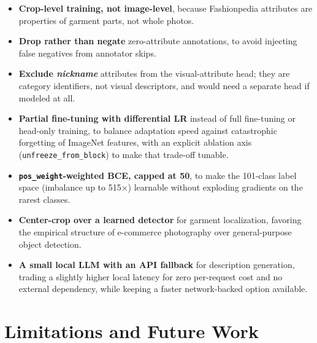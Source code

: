 \documentclass[11pt]{article}
\newcommand{\code}[1]{\texttt{\small #1}}
\begin{document}
\begin{itemize}
\item \textbf{Crop-level training, not image-level}, because Fashionpedia attributes are properties of garment parts, not whole photos.
\item \textbf{Drop rather than negate} zero-attribute annotations, to avoid injecting false negatives from annotator skips.
\item \textbf{Exclude \emph{nickname}} attributes from the visual-attribute head; they are category identifiers, not visual descriptors, and would need a separate head if modeled at all.
\item \textbf{Partial fine-tuning with differential LR} instead of full fine-tuning or head-only training, to balance adaptation speed against catastrophic forgetting of ImageNet features, with an explicit ablation axis (\code{unfreeze\_from\_block}) to make that trade-off tunable.
\item \textbf{\code{pos\_weight}-weighted BCE, capped at 50}, to make the 101-class label space (imbalance up to 515$\times$) learnable without exploding gradients on the rarest classes.
\item \textbf{Center-crop over a learned detector} for garment localization, favoring the empirical structure of e-commerce photography over general-purpose object detection.
\item \textbf{A small local LLM with an API fallback} for description generation, trading a slightly higher local latency for zero per-request cost and no external dependency, while keeping a faster network-backed option available.
\end{itemize}

\section{Limitations and Future Work}
\end{document}
